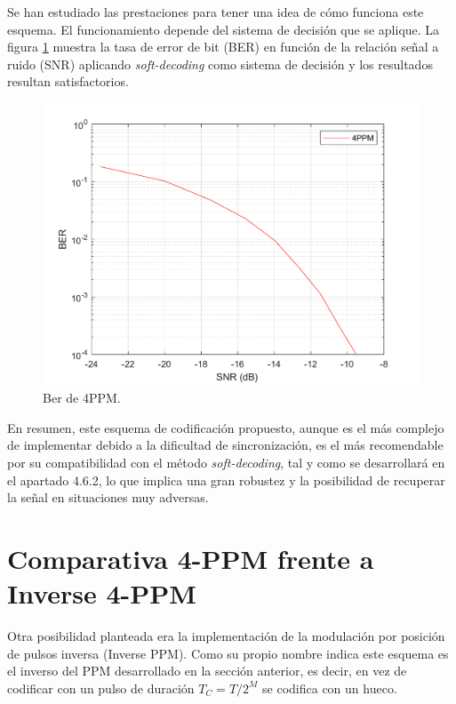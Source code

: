 Se han estudiado las prestaciones para tener una idea de cómo funciona este esquema.
El funcionamiento depende del sistema de decisión que se aplique. La figura 
\ref{solo_soft_ppm} muestra
la tasa de error de bit (BER) en función de la relación señal a ruido (SNR) aplicando
\textit{soft-decoding} como sistema de decisión y los resultados resultan satisfactorios.

\begin{figure}[ht]
    \centering
    \includegraphics[scale=0.4]{./figuras/solo_soft_ppm.pdf}
    \caption{\small{Ber de 4PPM.}}
    \label{solo_soft_ppm}%
\end{figure}


En resumen, este esquema de codificación propuesto, aunque es el más complejo de 
implementar debido a la dificultad de sincronización, es el más recomendable por su 
compatibilidad con el método \textit{soft-decoding}, tal y como se desarrollará en el 
apartado 4.6.2, lo que implica una gran robustez y la posibilidad de recuperar la 
señal en situaciones muy adversas.

\section{Comparativa 4-PPM frente a Inverse 4-PPM}
Otra posibilidad planteada era la implementación de la modulación por posición de 
pulsos inversa (Inverse PPM). Como su propio nombre indica este esquema es el inverso
del PPM desarrollado en la sección anterior, es decir, en vez de codificar con un pulso
de duración $ T_C = T/2^M $ se codifica con un hueco. \cite{ppm}

